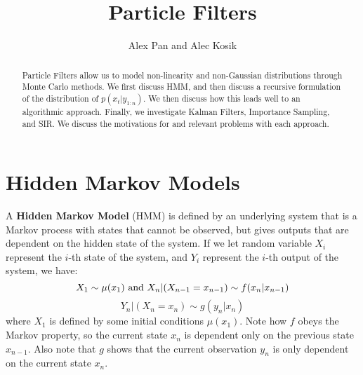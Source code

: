 \documentclass{article}
\title{\vspace{-2cm}Particle Filters} %
\author{Alex Pan and Alec Kosik}
\date{} %
\begin{document}
\maketitle

\begin{abstract}
Particle Filters allow us to model non-linearity and non-Gaussian distributions through Monte Carlo methods. We first discuss HMM, and then discuss a recursive formulation of the distribution of $p(x_t|y_{1:n})$. We then discuss how this leads well to an algorithmic approach. Finally, we investigate Kalman Filters, Importance Sampling, and SIR. We discuss the motivations for and relevant problems with each approach.
\end{abstract}

\section{Hidden Markov Models}

A \textbf{Hidden Markov Model} (HMM) is defined by an underlying system that is a Markov process with states that cannot be observed, but gives outputs that are dependent on the hidden state of the system. If we let random variable $X_i$ represent the $i$-th state of the system, and $Y_i$ represent the $i$-th output of the system, we have:
\begin{equation}
X_1 \sim \mu (x_1) \textnormal{ and } X_n|(X_{n-1}=x_{n-1}) \sim f(x_n|x_{n-1})
\end{equation}
\begin{equation}
Y_n|(X_n = x_n) \sim g(y_n|x_n)
\end{equation}
where $X_1$ is defined by some initial conditions $\mu(x_1)$. Note how $f$ obeys the Markov property, so the current state $x_n$ is dependent only on the previous state $x_{n-1}$. Also note that $g$ shows that the current observation $y_n$ is only dependent on the current state $x_n$.
\end{document}
